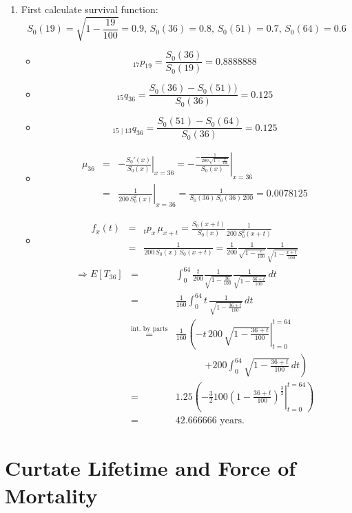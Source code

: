 \documentclass[11pt,fleqn,oneside]{book}
\begin{document}
\begin{enumerate}
\item
First calculate survival function:
$$
S_0(19) = \sqrt{1 - \frac{19}{100}} = 0.9,\,S_0(36)=0.8,\,S_0(51)=0.7,\,S_0(64)=0.6
$$
\begin{itemize}
\item 
$$
{_{17}p_{19}} = \frac{S_0(36)}{S_0(19)} = 0.8888888
$$
\item
$$
{_{15}q_{36}} = \frac{S_0(36) - S_0(51))}{S_0(36)} = 0.125
$$
\item
$$
{_{15 \mid 13}q_{36}} = \frac{S_0(51) - S_0(64)}{S_0(36)} = 0.125
$$
\item
\begin{eqnarray*}
\mu_{36} &=& \left.-\frac{S_0'(x)}{S_0(x)}\right|_{x=36} = \left.-\frac{-\frac{1}{200 \sqrt{1 - \frac{x}{100}}}}{S_0(x)}\right|_{x=36} \\
&=& \left.\frac{1}{200\,S_0^2(x)}\right|_{x=36} = \frac{1}{S_0(36)\,S_0(36)\,200} = 0.0078125
\end{eqnarray*}
\item
\begin{eqnarray*}
f_{x}(t) &=& {_tp_x}\,\mu_{x+t} = \frac{S_0(x+t)}{S_0(x)} \frac{1}{200\,S_0^2(x+t)}\\
&=& \frac{1}{200\,S_0(x)\,S_0(x+t)} = \frac{1}{200}\frac{1}{\sqrt{1 - \frac{x}{100}}} \frac{1}{\sqrt{1 - \frac{x+t}{100}}}
\end{eqnarray*}
\begin{eqnarray*}
\Rightarrow E\left[T_{36}\right] &=& \int_0^{64} \frac{t}{200}\frac{1}{\sqrt{1 - \frac{36}{100}}} \frac{1}{\sqrt{1 - \frac{36+t}{100}}}\,dt \\
&=& \frac{1}{160} \int_0^{64} t \, \frac{1}{\sqrt{1-\frac{36+t}{100}}}\,dt \\
&\stackrel{\text{int.\ by parts}}{=}& \frac{1}{160}
\left(
\left. -t\,200\,\sqrt{1-\frac{36+t}{100}}\right|_{t=0}^{t=64} \right. \\
&\;&\;\;\;\;\;\;\;\;\;\;\;\left.+ 200\int_0^{64}\sqrt{1-\frac{36+t}{100}}\,dt 
 \right)\\
&=& 1.25 \left(\left.-\frac{3}{2} 100 \left(1 - \frac{36+t}{100}\right)^{\frac{3}{2}}\right|_{t=0}^{t=64}\right)\\
&=& 42.666666 \text{ years.}
\end{eqnarray*}
\end{itemize}
\end{enumerate}
\normalsize

\section{Curtate Lifetime and Force of Mortality}
\label{CURLIFTFORC}
\end{document}

